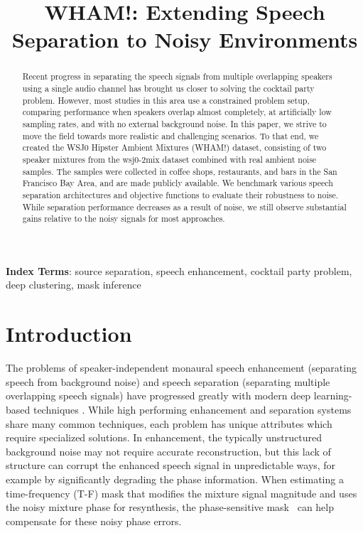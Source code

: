 \documentclass[a4paper]{article}
\title{WHAM!: Extending Speech Separation to Noisy Environments}
\begin{document}
\maketitle
\setlength{\abovedisplayskip}{4pt}
\setlength{\belowdisplayskip}{4pt}
\begin{abstract}
  Recent progress in separating the speech signals from multiple overlapping speakers using a single audio channel has brought us closer to solving the cocktail party problem.  However, most studies in this area use a constrained problem setup, comparing performance when speakers overlap almost completely, at artificially low sampling rates, and with no external background noise. In this paper, we strive to move the field towards more realistic and challenging scenarios. To that end, we created the WSJ0 Hipster Ambient Mixtures (WHAM!) dataset, consisting of two speaker mixtures from the wsj0-2mix dataset combined with real ambient noise samples. The samples were collected in coffee shops, restaurants, and bars in the San Francisco Bay Area, and are made publicly available.  We benchmark various speech separation architectures and objective functions to evaluate their robustness to noise.  While separation performance decreases as a result of noise, we still observe substantial gains relative to the noisy signals for most approaches.
\end{abstract}
\noindent\textbf{Index Terms}: source separation, speech enhancement,   cocktail party problem, deep clustering, mask inference

\section{Introduction}
The problems of speaker-independent monaural speech enhancement (separating speech from background noise) and speech separation (separating multiple overlapping speech signals) have progressed greatly with modern deep learning-based techniques \cite{Weninger2014RNN, Erdogan2015, Hershey2016, williamson2016complex, wang2018supervised, kolbaek2017joint, ephrat2018looking, leroux2019phasebook, Luo2018TasNet09arXiv}.   While high performing enhancement and separation systems share many common techniques, each problem has unique attributes which require specialized solutions.  In enhancement, the typically unstructured background noise may not require accurate reconstruction, but this lack of structure can corrupt the enhanced speech signal in unpredictable ways, for example by significantly degrading the phase information.  When  estimating a time-frequency (T-F) mask that modifies the mixture signal magnitude and uses the noisy mixture phase for resynthesis, the phase-sensitive mask~\cite{Erdogan2015} can help compensate for these noisy phase errors.   
\end{document}
